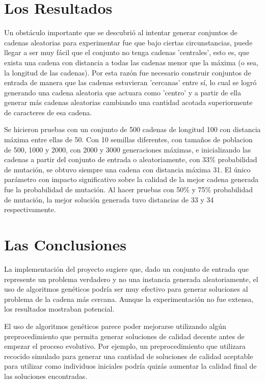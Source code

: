 \documentclass{article}
\begin{document}
\section{Los Resultados}
  Un obstáculo importante que se descubrió al intentar generar conjuntos de cadenas aleatorias para experimentar fue que
  bajo ciertas circunstancias, puede llegar a ser muy fácil que el conjunto no tenga cadenas 'centrales', esto es, que 
  exista una cadena con distancia a todas las cadenas menor que la máxima (o sea, la longitud de las cadenas).
  Por esta razón fue necesario construir conjuntos de entrada de manera que las cadenas estuvieran 'cercanas' entre sí,
  lo cual se logró generando una cadena aleatoria que actuara como 'centro' y a partir de ella generar más cadenas
  aleatorias cambiando una cantidad acotada superiormente de caracteres de esa cadena.

  Se hicieron pruebas con un conjunto de 500 cadenas de longitud 100 con distancia máxima entre ellas de 50.
  Con 10 semillas diferentes, con tamaños de poblacion de 500, 1000 y 2000, con 2000 y 3000 generaciones máximas,
  e inicializando las cadenas a partir del conjunto de entrada o aleatoriamente, con 33\% probabilidad de
  mutación, se obtuvo siempre una cadena con distancia máxima 31. El único parámetro con impacto
  significativo sobre la calidad de la mejor cadena generada fue la probabilidad de mutación. Al hacer pruebas
  con 50\% y 75\% probabilidad de mutación, la mejor solución generada tuvo distancias de 33 y 34 respectivamente.

\section{Las Conclusiones}
  La implementación del proyecto sugiere que, dado un conjunto de entrada que represente un problema verdadero
  y no una instancia generada aleatoriamente, el uso de algoritmos genéticos podría ser muy efectivo para generar soluciones
  al problema de la cadena más cercana. Aunque la experimentación no fue extensa, los resultados mostraban potencial.

  El uso de algoritmos genéticos parece poder mejorarse utilizando algún preprocedimiento que permita generar 
  soluciones de calidad decente antes de empezar el proceso evolutivo. Por ejemplo, un preprocedimiento que utilizara
  recocido simulado para generar una cantidad de soluciones de calidad aceptable para utilizar como individuos iniciales
  podría quizás aumentar la calidad final de las soluciones encontradas.
\end{document}
